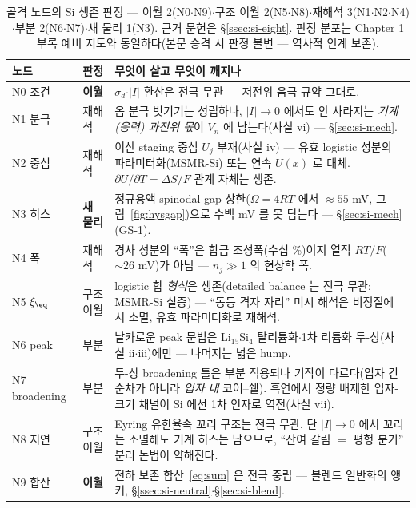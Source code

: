 \begin{table}[h]
\centering\small
\begin{tabular}{p{} p{} p{}}
\toprule
노드 & 판정 & 무엇이 살고 무엇이 깨지나 \\
\midrule
N0 조건 & \textbf{이월} & $\sigma_d$$\cdot$$|I|$ 환산은 전극 무관 --- 저전위 음극 규약 그대로. \\
N1 분극 & 재해석 & 옴 분극 벗기기는 성립하나, $|I|\to0$ 에서도 안 사라지는 \emph{기계(응력) 과전위 몫}이 $V_n$ 에 남는다(사실 vi) --- \S\ref{sec:si-mech}. \\
N2 중심 & 재해석 & 이산 staging 중심 $U_j$ 부재(사실 iv) --- 유효 logistic 성분의 파라미터화(MSMR-Si\cite{verbrugge_lisi2016}) 또는 연속 $U(x)$\cite{chevrier_dahn2009} 로 대체. $\partial U/\partial T=\Delta S/F$ 관계 자체는 생존. \\
N3 히스 & \textbf{새 물리} & 정규용액 spinodal gap 상한($\Omega{=}4RT$ 에서 $\approx55$ mV, 그림~\ref{fig:hysgap})으로 수백 mV 를 못 담는다 --- \S\ref{sec:si-mech}(GS-1). \\
N4 폭 & 재해석 & 경사 성분의 ``폭''은 합금 조성폭(수십 \%)이지 열적 $RT/F$($\sim26$ mV)가 아님 --- $n_j\gg1$ 의 현상학 폭. \\
N5 $\xi_\eq$ & 구조 이월 & logistic 합 \emph{형식}은 생존(detailed balance 는 전극 무관; MSMR-Si 실증\cite{verbrugge_lisi2016}) --- ``동등 격자 자리'' 미시 해석은 비정질에서 소멸, 유효 파라미터화로 재해석. \\
N6 peak & 부분 & 날카로운 peak 문법은 Li$_{15}$Si$_4$ 탈리튬화$\cdot$1차 리튬화 두-상(사실 ii$\cdot$iii)에만 --- 나머지는 넓은 hump. \\
N7 broadening & 부분 & 두-상 broadening 틀은 부분 적용되나 기작이 다르다(입자 간 순차가 아니라 \emph{입자 내} 코어--쉘\cite{mcdowell_coreshell2013}). 흑연에서 정량 배제한 입자-크기 채널이 Si 에선 1차 인자로 역전(사실 vii). \\
N8 지연 & 구조 이월 & Eyring 유한율속 꼬리 구조는 전극 무관. 단 $|I|\to0$ 에서 꼬리는 소멸해도 기계 히스는 남으므로, ``잔여 갈림 $=$ 평형 분기'' 분리 논법이 약해진다. \\
N9 합산 & \textbf{이월} & 전하 보존 합산~\eqref{eq:sum} 은 전극 중립 --- 블렌드 일반화의 앵커, \S\ref{ssec:si-neutral}$\cdot$\S\ref{sec:si-blend}. \\
\bottomrule
\end{tabular}
\caption{골격 노드의 Si 생존 판정 --- 이월 2(N0$\cdot$N9)$\cdot$구조 이월 2(N5$\cdot$N8)$\cdot$재해석
3(N1$\cdot$N2$\cdot$N4)$\cdot$부분 2(N6$\cdot$N7)$\cdot$새 물리 1(N3). 근거 문헌은 \S\ref{ssec:si-eight}.
판정 분포는 Chapter 1 부록 예비 지도와 동일하다(본문 승격 시 판정 불변 --- 역사적 인계 보존).}
\label{tab:si-nodemap}
\end{table}

